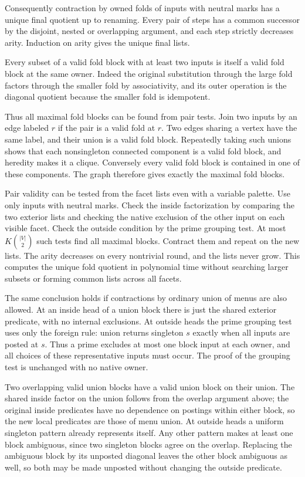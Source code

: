 Consequently contraction by owned folds of inputs
with neutral marks has
a unique final quotient up to renaming. Every pair
of steps has a common successor by the disjoint,
nested or overlapping argument, and each step
strictly decreases arity. Induction on arity gives
the unique final lists.

Every subset of a valid fold block with at least two
inputs is itself a valid fold block at the same
owner. Indeed the original substitution through the
large fold factors through the smaller fold by
associativity, and its outer operation is the
diagonal quotient because the smaller fold is
idempotent.

Thus all maximal fold blocks can be found from pair
tests. Join two inputs by an edge labeled $r$ if the
pair is a valid fold at $r$. Two edges sharing a
vertex have the same label, and their union is a
valid fold block. Repeatedly taking such unions
shows that each nonsingleton connected component
is a valid fold block, and heredity makes it a
clique. Conversely every valid fold block is
contained in one of these components. The graph
therefore gives exactly the maximal fold blocks.

Pair validity can be tested from the facet lists
even with a variable palette. Use only inputs with
neutral marks. Check the inside
factorization by comparing the two exterior lists
and checking the native exclusion of the other
input on each visible facet. Check the outside
condition by the prime grouping test. At most
$K\binom{|V|}{2}$ such tests find all maximal blocks.
Contract them and repeat on the new lists. The
arity decreases on every nontrivial round, and
the lists never grow. This computes the unique
fold quotient in polynomial time without searching
larger subsets or forming common lists across all
facets.

The same conclusion holds if contractions by ordinary
union of menus are also allowed. At an inside head
of a union block there is just the shared exterior
predicate, with no internal exclusions. At outside
heads the prime grouping test uses only the foreign
rule: union returns singleton $s$ exactly when all
inputs are posted at $s$. Thus a prime excludes at
most one block input at each owner, and all choices
of these representative inputs must occur. The proof
of the grouping test is unchanged with no native
owner.

Two overlapping valid union blocks have a valid union
block on their union. The shared inside factor on
the union follows from the overlap argument above;
the original inside predicates have no dependence
on postings within either block, so the new local
predicates are those of menu union. At outside heads
a uniform singleton pattern already represents
itself. Any other pattern makes at least one block
ambiguous, since two singleton blocks agree on the
overlap. Replacing the ambiguous block by its
unposted diagonal leaves the other block ambiguous
as well, so both may be made unposted without
changing the outside predicate.

